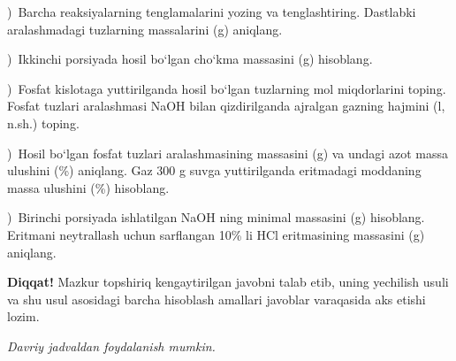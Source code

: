 \documentclass[11pt,a4paper]{article}
\newcommand{\qsep}{\par\vspace{13pt}}
\newcommand{\diqqat}[1]{\par\smallskip\noindent\textbf{Diqqat!} #1\par\medskip}
\newcommand{\hdrpill}[1]{\begin{tikzpicture}[baseline=0pt]\node[fill=ygreen,text=white,rounded corners=8pt,inner xsep=10pt,inner ysep=5pt,font=\fontsize{13}{15}\bfseries\selectfont] at (0,0.475){#1};\end{tikzpicture}}
\newcommand{\curvar}{}\fancyhead[R]{\hdrpill{\curvar}}
\begin{document}
)\ Barcha reaksiyalarning tenglamalarini yozing va tenglashtiring. Dastlabki aralashmadagi tuzlarning massalarini (g) aniqlang.\par
{})\ Ikkinchi porsiyada hosil bo`lgan cho`kma massasini (g) hisoblang.\par
{})\ Fosfat kislotaga yuttirilganda hosil bo`lgan tuzlarning mol miqdorlarini toping. Fosfat tuzlari aralashmasi NaOH bilan qizdirilganda ajralgan gazning hajmini (l, n.sh.) toping.\par
{})\ Hosil bo`lgan fosfat tuzlari aralashmasining massasini (g) va undagi azot massa ulushini (\%) aniqlang. Gaz 300 g suvga yuttirilganda eritmadagi moddaning massa ulushini (\%) hisoblang.\par
{})\ Birinchi porsiyada ishlatilgan NaOH ning minimal massasini (g) hisoblang. Eritmani neytrallash uchun sarflangan 10\% li HCl eritmasining massasini (g) aniqlang.\par
\diqqat{Mazkur topshiriq kengaytirilgan javobni talab etib, uning yechilish usuli va shu usul asosidagi barcha hisoblash amallari javoblar varaqasida aks etishi lozim.}\qsep
\newpage
\renewcommand{\curvar}{3-variant}
\thispagestyle{first}
\noindent\textit{Davriy jadvaldan foydalanish mumkin.}
\par\smallskip
\end{document}
